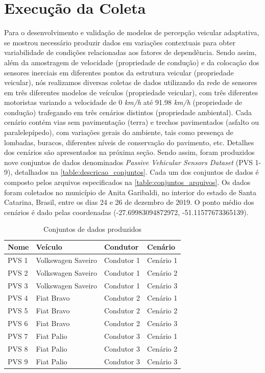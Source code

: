 \section{Execução da Coleta}

Para o desenvolvimento e validação de modelos de percepção veicular adaptativa, se mostrou necessário produzir dados em variações contextuais para obter variabilidade de condições relacionadas aos fatores de dependência. Sendo assim, além da amostragem de velocidade (propriedade de condução) e da colocação dos sensores inerciais em diferentes pontos da estrutura veicular (propriedade veicular), nós realizamos diversas coletas de dados utilizando da rede de sensores em três diferentes modelos de veículos (propriedade veicular), com três diferentes motoristas variando a velocidade de 0 \emph{km/h} até 91.98 \emph{km/h} (propriedade de condução) trafegando em três cenários distintos (propriedade ambiental). Cada cenário contém vias sem pavimentação (terra) e trechos pavimentados (asfalto ou paralelepípedo), com variações gerais do ambiente, tais como presença de lombadas, buracos, diferentes níveis de conservação do pavimento, etc. Detalhes dos cenários são apresentados na próxima seção. Sendo assim, foram produzidos nove conjuntos de dados denominados \textit{Passive Vehicular Sensors Dataset} (PVS 1-9), detalhados na \autoref{table:descricao_conjuntos}. Cada um dos conjuntos de dados é composto pelos arquivos especificados na \autoref{table:conjuntos_arquivos}. Os dados foram coletados no município de Anita Garibaldi, no interior do estado de Santa Catarina, Brasil, entre os dias 24 e 26 de dezembro de 2019. O ponto médio dos cenários é dado pelas coordenadas (-27.69983094872972, -51.11577673365139).

\begin{table}[H]
\small
\caption{Conjuntos de dados produzidos} 
\label{table:descricao_conjuntos}
\centering
\begin{tabular}{llll}
\toprule
\textbf{Nome} & \textbf{Veículo} & \textbf{Condutor} & \textbf{Cenário} \\ \midrule
PVS 1 & Volkswagen Saveiro & Condutor 1 & Cenário 1 \\ \midrule
PVS 2 & Volkswagen Saveiro & Condutor 1 & Cenário 2 \\ \midrule
PVS 3 & Volkswagen Saveiro & Condutor 1 & Cenário 3 \\ \midrule
PVS 4 & Fiat Bravo & Condutor 2 & Cenário 1 \\ \midrule
PVS 5 & Fiat Bravo & Condutor 2 & Cenário 2 \\ \midrule
PVS 6 & Fiat Bravo & Condutor 2 & Cenário 3 \\ \midrule
PVS 7 & Fiat Palio & Condutor 3 & Cenário 1 \\ \midrule
PVS 8 & Fiat Palio & Condutor 3 & Cenário 2 \\ \midrule
PVS 9 & Fiat Palio & Condutor 3 & Cenário 3 \\ \bottomrule
\end{tabular}
\end{table}

